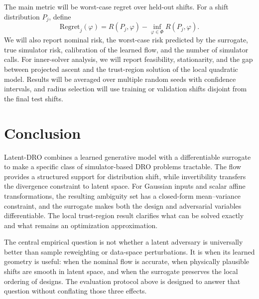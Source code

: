 \documentclass[11pt]{article}
\newcommand{\Phibox}{\Phi}
\newcommand{\design}{\varphi}
\begin{document}
The main metric will be worst-case regret over held-out shifts. For a shift distribution
$P_j$, define
\begin{equation}
  \label{eq:regret}
  \mathrm{Regret}_j(\design)=R(P_j,\design)-
  \inf_{\varphi\in\Phibox}R(P_j,\varphi).
\end{equation}
We will also report nominal risk, the worst-case risk predicted by the surrogate, true simulator
risk, calibration of the learned flow, and the number of simulator calls. For inner-solver
analysis, we will report feasibility, stationarity, and the gap between projected ascent and
the trust-region solution of the local quadratic model. Results will be averaged over multiple
random seeds with confidence intervals, and radius selection will use training or validation
shifts disjoint from the final test shifts.



\section{Conclusion}

Latent-DRO combines a learned generative model with a differentiable surrogate to make a
specific class of simulator-based DRO problems tractable. The flow provides a structured
support for distribution shift, while invertibility transfers the divergence constraint to
latent space. For Gaussian inputs and scalar affine transformations, the resulting ambiguity
set has a closed-form mean--variance constraint, and the surrogate makes both the design and
adversarial variables differentiable.
The local trust-region result clarifies what can be solved exactly and what remains an
optimization approximation.

The central empirical question is not whether a latent adversary is universally better than
sample reweighting or data-space perturbations. It is when its learned geometry is useful:
when the nominal flow is accurate, when physically plausible shifts are smooth in latent
space, and when the surrogate preserves the local ordering of designs. The evaluation
protocol above is designed to answer that question without conflating those three effects.
\end{document}
